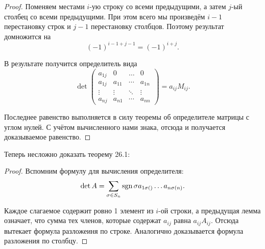 \begin{proof}
    Поменяем местами $i$-ую строку со всеми предыдущими, а затем $j$-ый столбец со всеми предыдущими. При этом всего мы произведём $i - 1$ перестановку строк и $j - 1$ перестановку столбцов. Поэтому результат домножится на
    $$
    (-1)^{i - 1 + j - 1} = (-1)^{i + j}.
    $$

    В результате получится определитель вида
    $$
    \det
    \begin{pmatrix}
        a_{1j} & 0      & \ldots & 0     \\
        a_{1j} & a_{11} & \cdots & a_{1n}\\
        \vdots & \vdots & \ddots & \vdots\\
        a_{nj} & a_{n1} & \cdots & a_{nn}
    \end{pmatrix} = a_{ij}M_{ij}.
    $$

    Последнее равенство выполняется в силу теоремы об определителе матрицы с углом нулей. С учётом вычисленного нами знака, отсюда и получается доказываемое равенство.
\end{proof}

Теперь несложно доказать теорему 26.1:

\begin{proof}
    Вспомним формулу для вычисления определителя:
    $$
    \det A = \sum_{\sigma \in S_n}\mathrm{sgn}\,\sigma a_{1\sigma()} \ldots a_{n\sigma(n)}.
    $$

    Каждое слагаемое содержит ровно 1 элемент из $i$-ой строки, а предыдущая лемма означает, что сумма тех членов, которые содержат $a_{ij}$ равна $a_{ij}A_{ij}$. Отсюда вытекает формула разложеиня по строке. Аналогично доказывается формула разложения по столбцу.
\end{proof}



